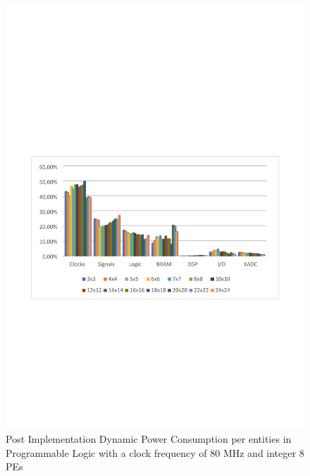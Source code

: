 \begin{itemize}
\begin{figure}[!htbp]
\includegraphics[scale=0.7,angle=0]{./figure/graphs/power_pldyn_div_int8_freq_80mhz.pdf}
\caption{Post Implementation Dynamic Power Consumption per entities in Programmable Logic with a clock frequency of 80 MHz and integer 8 PEs}
\label{fig:dynpowint8ent80}
\end{figure}
\begin{figure}[!htbp]
\centering
\captionsetup{justification=centering}

\end{figure}
\end{itemize}
